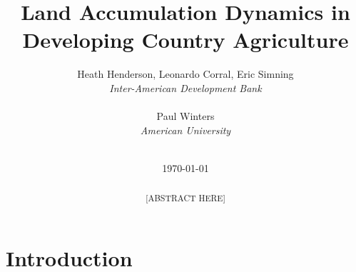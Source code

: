 \documentclass[english]{article}
\title{Land Accumulation Dynamics in Developing Country Agriculture}
\author{
Heath Henderson, Leonardo Corral, Eric Simning\\
\textit{Inter-American Development Bank} \\
\\
Paul Winters \\
\textit{American University}
\\ \\
}
\date{\today}
\begin{document}

\begin{titlepage}
\maketitle

\begin{abstract}
~~~~~~~~~~~~~~~~~~~~~~~~~~~~~[ABSTRACT HERE]
\end{abstract}
\thispagestyle{empty}
\end{titlepage}
\newpage


\doublespacing


\section{Introduction}
\label{sec: intro}
\end{document}
